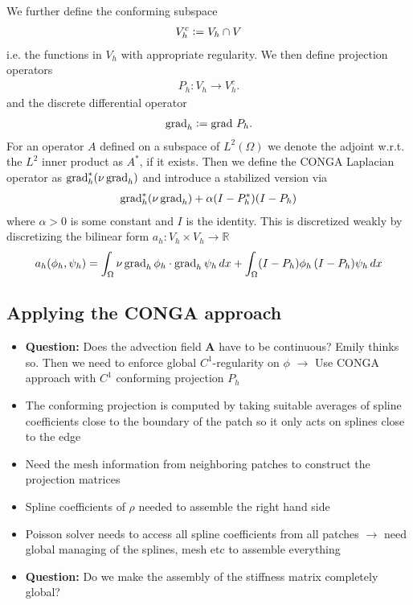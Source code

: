 \documentclass[presentation.tex]{subfiles}
\begin{document}
We further define the conforming subspace
\begin{align*}
    V_h^c \vcentcolon= V_h \cap V
\end{align*}
i.e. the functions in $V_h$ with appropriate regularity. We then define
projection operators
\begin{align*}
    P_h: V_h \rightarrow V_h^c.
\end{align*}
and the discrete differential operator
\begin{align*}
    \operatorname{grad}_h \vcentcolon= \operatorname{grad} \, P_h.
\end{align*}
For an operator $A$ defined on a subspace of $L^2(\Omega)$ we denote the 
adjoint w.r.t. the $L^2$ inner product as $A^*$, if it exists.
Then we define the CONGA Laplacian operator as $\operatorname{grad}_h^* (\nu \operatorname{grad}_h)$
and introduce a stabilized version via
\begin{align*}
    \operatorname{grad}_h^*(\nu \operatorname{grad}_h) + \alpha (I-P_h^*)(I-P_h)
\end{align*}
where $\alpha > 0$ is some constant and $I$ is the identity. This is discretized weakly by discretizing the bilinear
form $a_h: V_h \times V_h \rightarrow \mathbb{R}$
\begin{align*}
    a_h(\phi_h, \psi_h) = \int_\Omega \nu \operatorname{grad}_h \phi_h \cdot \operatorname{grad}_h \psi_h \, dx 
                        + \int_\Omega (I-P_h)\phi_h \, (I-P_h)\psi_h \, dx
\end{align*}

\subsection*{Applying the CONGA approach}
\begin{itemize}
    \item \textbf{Question:} Does the advection field $\mathbf{A}$ have to be
            continuous? Emily thinks so. Then we need to enforce global $C^1$-regularity on $\phi$ 
    $\rightarrow$ Use CONGA approach with $C^1$ conforming projection $P_h$
    \item   The conforming projection is computed by taking suitable averages of spline coefficients close to 
            the boundary of the patch so it only acts on splines close to the edge
    \item   Need the mesh information from neighboring patches
            to construct the projection matrices
    \item Spline coefficients of $\rho$ needed to assemble the right hand side
    \item Poisson solver needs to access all spline coefficients from all patches
            $\rightarrow$ need global managing of the splines, mesh etc 
            to assemble everything
    \item \textbf{Question:} Do we make the assembly of the stiffness matrix completely global?
\end{itemize}
\end{document}
